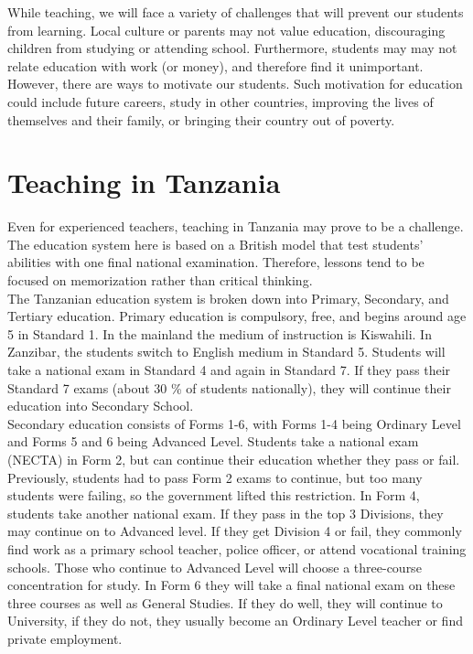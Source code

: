 While teaching, we will face a variety of challenges that will prevent our students from learning.  Local culture or parents may not value education, discouraging children from studying or attending school.  Furthermore, students may may not relate education with work (or money), and therefore find it unimportant.  However, there are ways to motivate our students.  Such motivation for education could include future careers, study in other countries, improving the lives of themselves and their family, or bringing their country out of poverty.  

\section{Teaching in Tanzania}
Even for experienced teachers, teaching in Tanzania may prove to be a challenge.  The education system here is based on a British model that test students’ abilities with one final national examination.  Therefore, lessons tend to be focused on memorization rather than critical thinking.  \\

The Tanzanian education system is broken down into Primary, Secondary, and Tertiary education.  Primary education is compulsory, free, and begins around age 5 in Standard 1. In the mainland the medium of instruction is Kiswahili.  In Zanzibar, the students switch to English medium in Standard 5. Students will take a national exam in Standard 4 and again in Standard 7.  If they pass their Standard 7 exams (about 30 \% of students nationally), they will continue their education into Secondary School.  \\

Secondary education consists of Forms 1-6, with Forms 1-4 being Ordinary Level and Forms 5 and 6 being Advanced Level.  Students take a national exam (NECTA) in Form 2, but can continue their education whether they pass or fail.  Previously, students had to pass Form 2 exams to continue, but too many students were failing, so the government lifted this restriction.  In Form 4, students take another national exam.  If they pass in the top 3 Divisions, they may continue on to Advanced level.  If they get Division 4 or fail, they commonly find work as a primary school teacher, police officer, or attend vocational training schools.   Those who continue to Advanced Level will choose a three-course concentration for study.  In Form 6 they will take a final national exam on these three courses as well as General Studies.  If they do well, they will continue to University, if they do not, they usually become an Ordinary Level teacher or find private employment.\\

